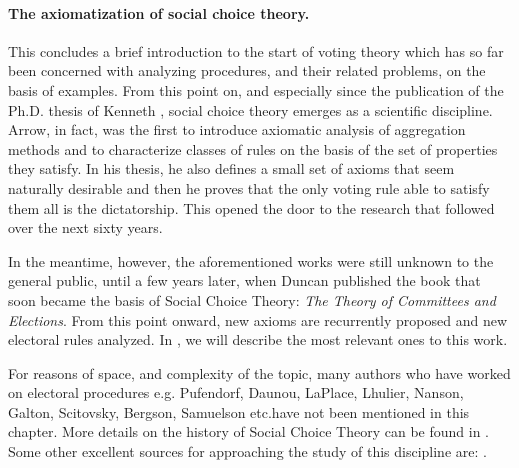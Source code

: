 \paragraph{The axiomatization of social choice theory.}
This concludes a brief introduction to the start of voting theory which has so far been concerned with analyzing procedures, and their related problems, on the basis of examples. From this point on, and especially since the publication of the Ph.D. thesis of Kenneth \citet{Arrow1951}, social choice theory emerges as a scientific discipline. Arrow, in fact, was the first to introduce axiomatic analysis of aggregation methods and to characterize classes of rules on the basis of the set of properties they satisfy. In his thesis, he also defines a small set of axioms that seem naturally desirable and then he proves that the only voting rule able to satisfy them all is the dictatorship. This opened the door to the research that followed over the next sixty years.

In the meantime, however, the aforementioned works were still unknown to the general public, until a few years later, when Duncan \citet{Black1958} published the book that soon became the basis of Social Choice Theory: \textit{The Theory of Committees and Elections}. From this point onward, new axioms are recurrently proposed and new electoral rules analyzed. In , we will describe the most relevant ones to this work.

For reasons of space, and complexity of the topic, many authors who have worked on electoral procedures \textemdash e.g. Pufendorf, Daunou, LaPlace, Lhulier, Nanson, Galton, Scitovsky, Bergson, Samuelson etc.\textemdash have not been mentioned in this chapter. More details on the history of Social Choice Theory can be found in \citet{Black1958,McLeanUrken1995,McLean1990,Urken2004}. Some other excellent sources for approaching the study of this discipline are: \citet{Arrow2002,Arrow2011,Gaertner2006, Fishburn2015, Taylor2005, Nitzan2009}.
